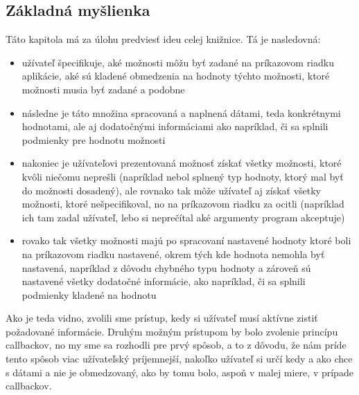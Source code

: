 \documentclass{article}
\begin{document}
\subsection{Základná myšlienka}
Táto kapitola má za úlohu predviesť ideu celej knižnice. Tá je nasledovná:
\begin{itemize}
	\item užívateľ špecifikuje, aké možnosti môžu byť zadané na príkazovom riadku aplikácie, aké sú kladené obmedzenia na hodnoty týchto možnosti, ktoré možnosti musia byť zadané a podobne
	\item následne je táto množina spracovaná a naplnená dátami, teda konkrétnymi hodnotami, ale aj dodatočnými informáciami ako napríklad, či sa splnili podmienky pre hodnotu možnosti
	\item nakoniec je užívateľovi prezentovaná možnosť získať všetky možnosti, ktoré kvôli niečomu neprešli (napríklad nebol splnený typ hodnoty, ktorý mal byť do možnosti dosadený), ale rovnako tak môže užívateľ aj získať všetky možnosti, ktoré nešpecifikoval, no na príkazovom riadku za ocitli (napríklad ich tam zadal užívateľ, lebo si neprečítal aké argumenty program akceptuje)
	\item rovako tak všetky možnosti majú po spracovaní nastavené hodnoty ktoré boli na príkazovom riadku nastavené, okrem tých kde hodnota nemohla byť nastavená, napríklad z dôvodu chybného typu hodnoty a zároveň sú nastavené všetky dodatočné informácie, ako napríklad, či sa splnili podmienky kladené na hodnotu
\end{itemize}
Ako je teda vidno, zvolili sme prístup, kedy si užívateľ musí aktívne zistiť požadované informácie. Druhým možným prístupom by bolo zvolenie princípu callbackov, no my sme sa rozhodli pre prvý spôsob, a to z dôvodu, že nám príde tento spôsob viac užívateľský príjemnejší, nakoľko užívateľ si určí kedy a ako chce s dátami a nie je obmedzovaný, ako by tomu bolo, aspoň v malej miere, v prípade callbackov.
\end{document}
